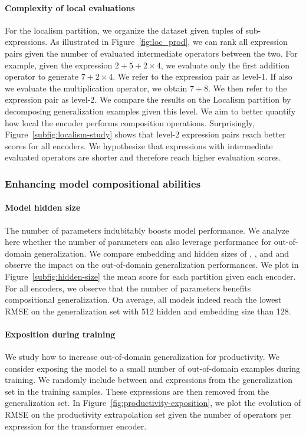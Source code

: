 \paragraph{Complexity of local evaluations} For the localism partition, we organize the dataset given tuples of sub-expressions. As illustrated in Figure~\ref{fig:loc_prod}, we can rank all expression pairs given the number of evaluated intermediate operators between the two. For example, given the expression $2 + 5 + 2 \times 4$, we evaluate only the first addition operator to generate $7 + 2 \times 4$. We refer to the expression pair as level-1. If also we evaluate the multiplication operator, we obtain $7 + 8$. We then refer to the expression pair as level-2. We compare the results on the Localism partition by decomposing generalization examples given this level. We aim to better quantify how local the encoder performs composition operations. Surprisingly, Figure~\ref{subfig:localism-study} shows that level-2 expression pairs reach better scores for all encoders. We hypothesize that expressions with intermediate evaluated operators are shorter and therefore reach higher evaluation scores.

\subsubsection{Enhancing model compositional abilities}

\paragraph{Model hidden size} The number of parameters indubitably boosts model performance. We analyze here whether the number of parameters can also leverage performance for out-of-domain generalization. We compare embedding and hidden sizes of , , and  and observe the impact on the out-of-domain generalization performances. We plot in Figure~\ref{subfig:hidden-size} the mean score for each partition given each encoder. For all encoders, we observe that the number of parameters benefits compositional generalization. On average, all models indeed reach the lowest RMSE on the generalization set with 512 hidden and embedding size than 128.

\paragraph{Exposition during training} We study how to increase out-of-domain generalization for productivity. We consider exposing the model to a small number of out-of-domain examples during training. We randomly include between  and  expressions from the generalization set in the training samples. These expressions are then removed from the generalization set. In Figure~\ref{fig:productivity-exposition}, we plot the evolution of RMSE on the productivity extrapolation set given the number of operators per expression for the transformer encoder. 

